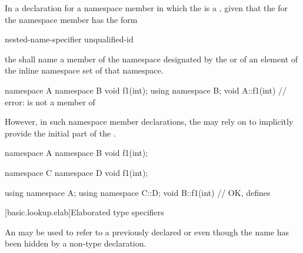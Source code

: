 \pnum
In a declaration for a namespace member in which the
 is a , given that the
 for the namespace member has the form
\begin{ncbnf}
nested-name-specifier unqualified-id
\end{ncbnf}
the
 shall name a member of the namespace
designated by the 
or of an element of the inline namespace set of that namespace.
\begin{example}
\begin{codeblock}
namespace A {
  namespace B {
    void f1(int);
  }
  using namespace B;
}
void A::f1(int){ }  // error:  is not a member of 
\end{codeblock}
\end{example}
However, in such namespace member declarations, the
 may rely on 
to implicitly provide the initial part of the
.
\begin{example}
\begin{codeblock}
namespace A {
  namespace B {
    void f1(int);
  }
}

namespace C {
  namespace D {
    void f1(int);
  }
}

using namespace A;
using namespace C::D;
void B::f1(int){ }  // OK, defines 
\end{codeblock}
\end{example}
%

[basic.lookup.elab]{Elaborated type specifiers}%
%

\pnum
An  may be
used to refer to a previously declared  or
 even though the name has been hidden by a non-type
declaration.

